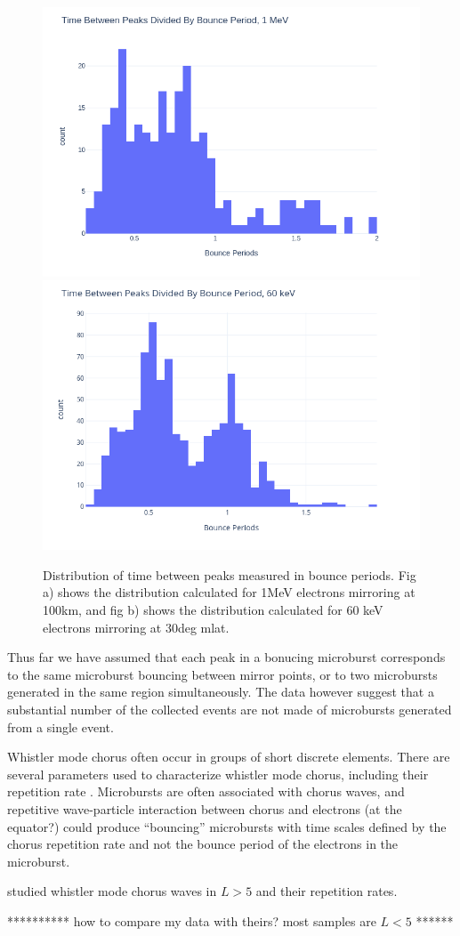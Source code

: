 \documentclass[draft]{agujournal2019}
\begin{document}
\begin{figure}[h!]
\includegraphics[width=.5\textwidth]{period_hist_1_MeV.png}
\includegraphics[width=.5\textwidth]{period_hist_60_keV.png}
\label{fig:periods}
\caption{Distribution of time between peaks measured in bounce periods. Fig a) shows the distribution calculated for 1MeV electrons mirroring at 100km, and fig b) shows the distribution calculated for 60 keV electrons mirroring at 30deg mlat.}
\end{figure} 

Thus far we have assumed that each peak in a bonucing microburst corresponds to the same microburst bouncing between mirror points, or to two microbursts generated in the same region simultaneously.
The data however suggest that a substantial number of the collected events are not made of microbursts generated from a single event.

Whistler mode chorus often occur in groups of short discrete elements. 
There are several parameters used to characterize whistler mode chorus, including their repetition rate \cite{repetition_rate}.  
Microbursts are often associated with chorus waves, and repetitive wave-particle interaction between chorus and electrons (at the equator?) could produce ``bouncing'' microbursts with time scales defined by the chorus repetition rate and not the bounce period of the electrons in the microburst. 

\cite{repetition_rate} studied whistler mode chorus waves in $L>5$ and their repetition rates. 

**********
how to compare my data with theirs? most samples are $L<5$ 
******
\end{document}
